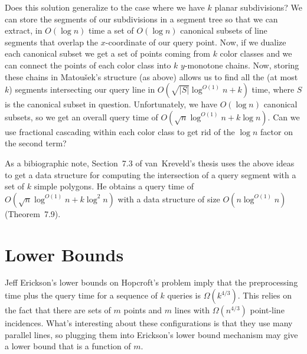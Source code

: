 \documentclass{article}
\newcommand{\polylog}{\log^{O(1)}}
\begin{document}
Does this solution generalize to the case where we have $k$ planar
subdivisions?  We can store the segments of our subdivisions in a
segment tree so that we can extract, in $O(\log n)$ time a set of
$O(\log n)$ canonical subsets of line segments that overlap the
$x$-coordinate of our query point.  Now, if we dualize each canonical
subset we get a set of points coming from $k$ color classes and we can
connect the points of each color class into $k$ $y$-monotone chains.
Now, storing these chains in Matou\v{s}ek's structure (as above)
allows us to find all the (at most $k$) segments intersecting our
query line in $O(\sqrt{|S|}\polylog n + k)$ time, where $S$ is the
canonical subset in question.  Unfortunately, we have $O(\log n)$
canonical subsets, so we get an overall query time of
$O(\sqrt{n}\polylog n + k\log n)$.  Can we use fractional cascading
within each color class to get rid of the $\log n$ factor on the
second term?

As a bibiographic note, Section~7.3 of van~Kreveld's thesis
\cite{vk92} uses the above ideas to get a data structure for computing
the intersection of a query segment with a set of $k$ simple polygons.
He obtains a query time of $O(\sqrt{n}\polylog n + k\log^2 n)$ with a
data structure of size $O(n\polylog n)$ (Theorem~7.9).

\section{Lower Bounds}

Jeff Erickson's lower bounds on Hopcroft's problem imply that the
preprocessing time plus the query time for a sequence of $k$ queries
is $\Omega(k^{4/3})$.  This relies on the fact that there are sets of
$m$ points and $m$ lines with $\Omega(n^{4/3})$ point-line incidences.
What's interesting about these configurations is that they use many
parallel lines, so plugging them into Erickson's lower bound mechanism
may give a lower bound that is a function of $m$.



\end{document}

